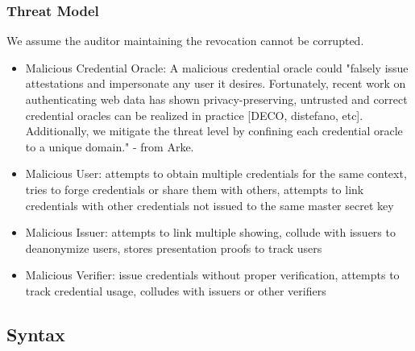 \subsubsection{Threat Model}
We assume the auditor maintaining the revocation cannot be corrupted.

\begin{itemize}
    \item Malicious Credential Oracle: A malicious credential oracle could "falsely issue attestations and impersonate any user it desires. Fortunately, recent work on authenticating web data has shown privacy-preserving, untrusted and correct credential oracles can be realized in practice [DECO, distefano, etc]. Additionally, we mitigate the threat level by confining each credential oracle to a unique domain." - from Arke. 
    \item Malicious User: attempts to obtain multiple credentials for the same context, tries to forge credentials or share them with others, attempts to link credentials with other credentials not issued to the same master secret key
    \item Malicious Issuer: attempts to link multiple showing, collude with issuers to deanonymize users, stores presentation proofs to track users
    \item Malicious Verifier: issue credentials without proper verification, attempts to track credential usage, colludes with issuers or other verifiers
\end{itemize}



\subsection{Syntax}

